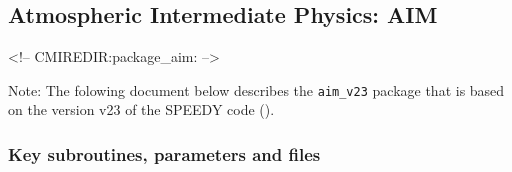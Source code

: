 \subsection{Atmospheric Intermediate Physics: AIM}
\label{sec:pkg:aim}
\begin{rawhtml}
<!-- CMIREDIR:package_aim: -->
\end{rawhtml}

Note:
 The folowing document below describes the \texttt{aim\_v23} package
 that is based on the version v23 of the SPEEDY code (\cite{molteni:03}).

\subsubsection{Key subroutines, parameters and files}
\label{sec:pkg:aim:implementation}

